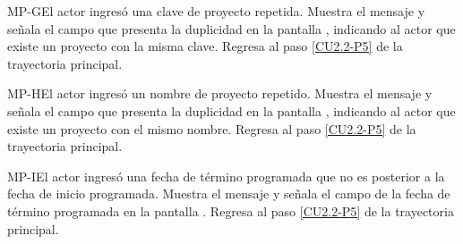 	\begin{UCtrayectoriaA}{MP-G}{El actor ingresó una clave de proyecto repetida.}
		\UCpaso[\UCsist] Muestra el mensaje  y señala el campo que presenta la duplicidad en la pantalla , indicando al actor que existe un proyecto con la misma clave.
		\UCpaso Regresa al paso \ref{CU2.2-P5} de la trayectoria principal.
	\end{UCtrayectoriaA}
	
	\begin{UCtrayectoriaA}{MP-H}{El actor ingresó un nombre de proyecto repetido.}
		\UCpaso[\UCsist] Muestra el mensaje  y señala el campo que presenta la duplicidad en la pantalla , indicando al actor que existe un proyecto con el mismo nombre.
		\UCpaso Regresa al paso \ref{CU2.2-P5} de la trayectoria principal.
	\end{UCtrayectoriaA}

	\begin{UCtrayectoriaA}{MP-I}{El actor ingresó una fecha de término programada que no es posterior a la fecha de inicio programada.}
		\UCpaso[\UCsist] Muestra el mensaje  y señala el campo de la fecha de término programada en la pantalla .
		\UCpaso Regresa al paso \ref{CU2.2-P5} de la trayectoria principal.
	\end{UCtrayectoriaA}